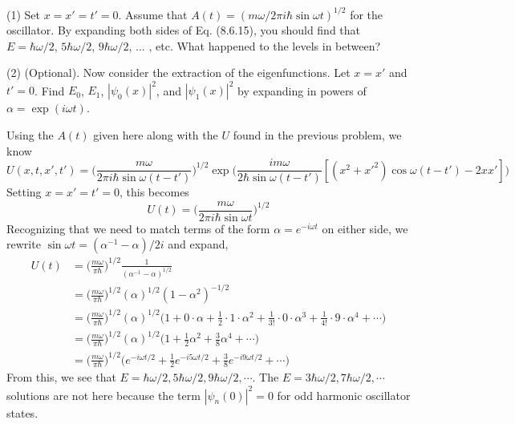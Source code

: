 \documentclass[../principles-of-quantum-mechanics.tex]{subfiles}
\begin{document}
\begin{questions}
		(1) Set $x = x' = t' = 0$. Assume that $A(t) = (m\omega/2\pi i \hbar \sin \omega t)^{1/2}$ for the oscillator. By expanding both sides of Eq. (8.6.15), you should find that $E = \hbar\omega/2$, $5\hbar\omega/2$, $9\hbar\omega/2$, $\ldots$ , etc. What happened to the levels in between?
		
		(2) (Optional). Now consider the extraction of the eigenfunctions. Let $x = x'$ and $t' = 0$. Find $E_0$, $E_1$, $|\psi_0(x)|^2$, and $|\psi_1(x)|^2$ by expanding in powers of $\alpha = \exp(i\omega t)$.
		\begin{solution}
			Using the $A(t)$ given here along with the $U$ found in the previous problem, we know
			$$U(x, t, x', t') = \Big(\frac{m\omega}{2\pi i \hbar\sin\omega(t - t')}\Big)^{1/2}\exp\Big(\frac{im\omega}{2\hbar\sin\omega(t-t')}[(x^2 + x'^2)\cos\omega(t - t') - 2xx']\Big)$$
			Setting $x = x' = t' = 0$, this becomes
			$$U(t) = \Big(\frac{m\omega}{2\pi i \hbar\sin\omega t}\Big)^{1/2}$$
			Recognizing that we need to match terms of the form $\alpha = e^{-i\omega t}$ on either side, we rewrite $\sin\omega t = (\alpha^{-1} - \alpha)/2i$ and expand,
			\begin{align*}
				U(t) &= \Big(\frac{m\omega}{\pi\hbar}\Big)^{1/2}\frac{1}{(\alpha^{-1} - \alpha)^{1/2}} \\
				&= \Big(\frac{m\omega}{\pi\hbar}\Big)^{1/2}(\alpha)^{1/2}(1 - \alpha^2)^{-1/2} \\
				&= \Big(\frac{m\omega}{\pi\hbar}\Big)^{1/2}(\alpha)^{1/2}\Big(1 + 0\cdot\alpha + \frac{1}{2}\cdot1\cdot\alpha^2 + \frac{1}{3!}\cdot0\cdot\alpha^3 + \frac{1}{4!}\cdot9\cdot\alpha^4 + \cdots\Big) \\
				&= \Big(\frac{m\omega}{\pi\hbar}\Big)^{1/2}(\alpha)^{1/2}\Big(1 + \frac{1}{2}\alpha^2 + \frac{3}{8}\alpha^4 + \cdots\Big) \\
				&= \Big(\frac{m\omega}{\pi\hbar}\Big)^{1/2}\Big(e^{-i\omega t/2} + \frac{1}{2}e^{-i5\omega t/2} + \frac{3}{8}e^{-i9\omega t/2} + \cdots\Big)
			\end{align*}
			From this, we see that $E = \hbar\omega/2, 5\hbar\omega/2, 9\hbar\omega/2, \cdots$. The $E = 3\hbar\omega/2, 7\hbar\omega/2, \cdots$ solutions are not here because the term $|\psi_n(0)|^2 = 0$ for odd harmonic oscillator states.
			

\end{solution}
\end{questions}
\end{document}
